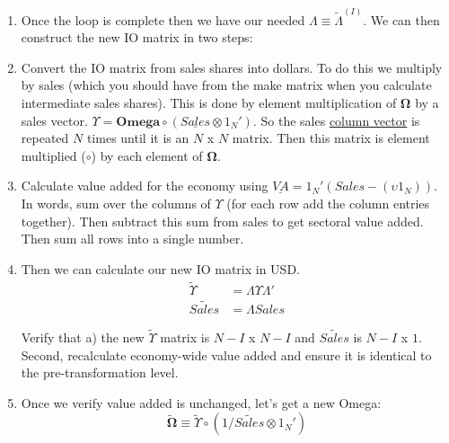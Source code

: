 \documentclass[12pt,english]{article}
\begin{document}
\begin{enumerate}
\begin{enumerate}
		\item Remove the sector $s(i)$ from the dynamic sector list. 
	\end{enumerate}
	\item Once the loop is complete then we have our needed $\Lambda \equiv \tilde{\Lambda}^{(I)}$. We can then construct the new IO matrix in two steps:
	\item Convert the IO matrix from sales shares into dollars. To do this we multiply by sales (which you should have from the make matrix when you calculate intermediate sales shares). This is done by element multiplication of $\mathbf{\Omega}$ by a sales vector. $\Upsilon = \mathbf{Omega} \circ (\underline{Sales} \otimes 1_N')$. So the sales \underline{column vector} is repeated $N$ times until it is an $N$ x $N$ matrix. Then this matrix is element multiplied ($\circ$) by each element of $\mathbf{\Omega}$.
	\item Calculate value added for the economy using $\underline{VA} = 1_N'(Sales - (\upsilon 1_N))$. In words, sum over the columns of $\Upsilon$ (for each row add the column entries together). Then subtract this sum from sales to get sectoral value added. Then sum all rows into a single number.
	\item Then we can calculate our new IO matrix in USD.
	\begin{align*}
		\tilde{\Upsilon} &= \Lambda \Upsilon \Lambda'\\
		\tilde{Sales} &= \Lambda Sales
	\end{align*}
	
	Verify that a) the new $\tilde{\Upsilon}$ matrix is $N-I$ x $N-I$ and $\tilde{Sales}$ is $N-I$ x $1$. Second, recalculate economy-wide value added and ensure it is identical to the pre-transformation level.
	\item Once we verify value added is unchanged, let's get a new Omega:
	$$
		\mathbf{\tilde{\Omega}}\equiv \tilde{\Upsilon} \circ (1/\tilde{Sales} \otimes 1_N')
	$$
	
\end{enumerate}
\end{document}
